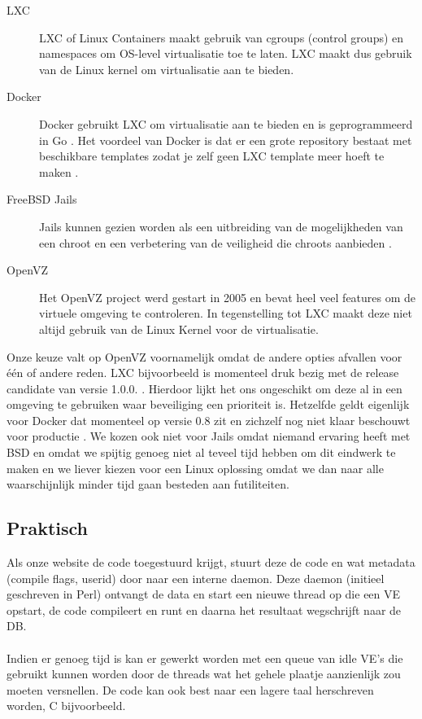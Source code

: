 \begin{description}
\item[LXC] LXC of Linux Containers maakt gebruik van cgroups (control groups) en namespaces om OS-level virtualisatie toe te laten. LXC maakt dus gebruik van de Linux kernel om virtualisatie aan te bieden.
\item[Docker] Docker gebruikt LXC om virtualisatie aan te bieden en is geprogrammeerd in Go \cite{dockergithub}. Het voordeel van Docker is dat er een grote repository bestaat met beschikbare templates zodat je zelf geen LXC template meer hoeft te maken \cite{dockerrepo}.
\item[FreeBSD Jails] Jails kunnen gezien worden als een uitbreiding van de mogelijkheden van een chroot en een verbetering van de veiligheid die chroots aanbieden \cite{freebsd}.
\item[OpenVZ] Het OpenVZ project werd gestart in 2005 en bevat heel veel features om de virtuele omgeving te controleren. In tegenstelling tot LXC maakt deze niet altijd gebruik van de Linux Kernel voor de virtualisatie.
\end{description}

Onze keuze valt op OpenVZ voornamelijk omdat de andere opties afvallen voor \'e\'en of andere reden. LXC bijvoorbeeld is momenteel druk bezig met de release candidate van versie 1.0.0. \cite{lxcbuilds}. Hierdoor lijkt het ons ongeschikt om deze al in een omgeving te gebruiken waar beveiliging een prioriteit is. Hetzelfde geldt eigenlijk voor Docker dat momenteel op versie 0.8 zit \cite{dockerpunt8} en zichzelf nog niet klaar beschouwt voor productie \cite{dockerv1}. We kozen ook niet voor Jails omdat niemand ervaring heeft met BSD en omdat we spijtig genoeg niet al teveel tijd hebben om dit eindwerk te maken en we liever kiezen voor een Linux oplossing omdat we dan naar alle waarschijnlijk minder tijd gaan besteden aan futiliteiten.\\ 

\subsection{Praktisch}
Als onze website de code toegestuurd krijgt, stuurt deze de code en wat metadata (compile flags, userid) door naar een interne daemon. Deze daemon (initieel geschreven in Perl) ontvangt de data en start een nieuwe thread op die een VE opstart, de code compileert en runt en daarna het resultaat wegschrijft naar de DB.\\
\\
Indien er genoeg tijd is kan er gewerkt worden met een queue van idle VE's die gebruikt kunnen worden door de threads wat het gehele plaatje aanzienlijk zou moeten versnellen. De code kan ook best naar een lagere taal herschreven worden, C bijvoorbeeld. 
